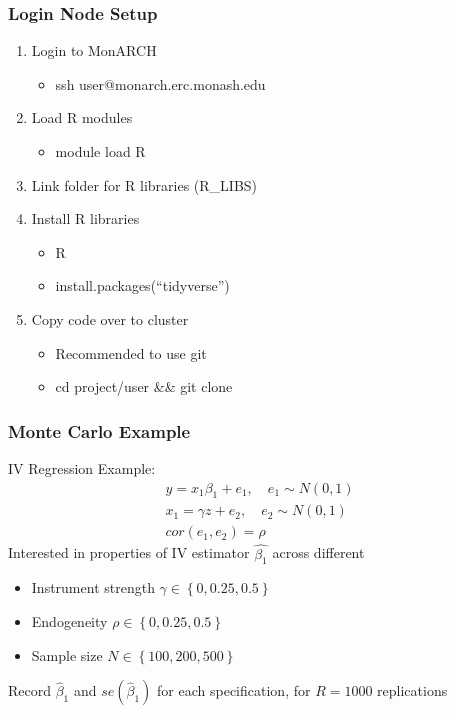 \documentclass[aspectratio=169,notheorems]{beamer}
\theoremstyle{plain}
\theoremstyle{plain}
\numberwithin{equation}{section}
\begin{document}
\begin{frame}
\frametitle{Login Node Setup}
\begin{enumerate}
\item Login to MonARCH
	\begin{itemize}
	\item ssh user@monarch.erc.monash.edu
	\end{itemize}
\item Load R modules
	\begin{itemize}
	\item module load R
	\end{itemize}
\item Link folder for R libraries (R\_LIBS)
\item Install R libraries
	\begin{itemize}
	\item R
	\item install.packages(``tidyverse'')
	\end{itemize}
\item Copy code over to cluster
	\begin{itemize}
	\item Recommended to use git
	\item cd project/user \&\& git clone 
	\end{itemize}
\end{enumerate}
\end{frame}

\begin{frame}
\frametitle{Monte Carlo Example}
IV Regression Example:
\begin{align}
y = x_1 \beta_1 + e_1, \quad e_1 \sim N (0, 1) \\
x_1 = \gamma z + e_2, \quad e_2 \sim N(0, 1) \\
cor(e_1, e_2) = \rho \nonumber
\end{align}
Interested in properties of IV estimator $\widehat{\beta_1}$ across different 
\begin{itemize}
\item Instrument strength $\gamma \in \left\lbrace 0, 0.25, 0.5\right\rbrace $
\item Endogeneity $\rho \in \left\lbrace 0, 0.25, 0.5 \right\rbrace $
\item Sample size $N \in \left\lbrace 100, 200, 500 \right\rbrace $
\end{itemize}
Record $\widehat{\beta}_1$ and $se(\widehat{\beta}_1)$ for each specification, for $R = 1000$ replications
\end{frame}
\end{document}
